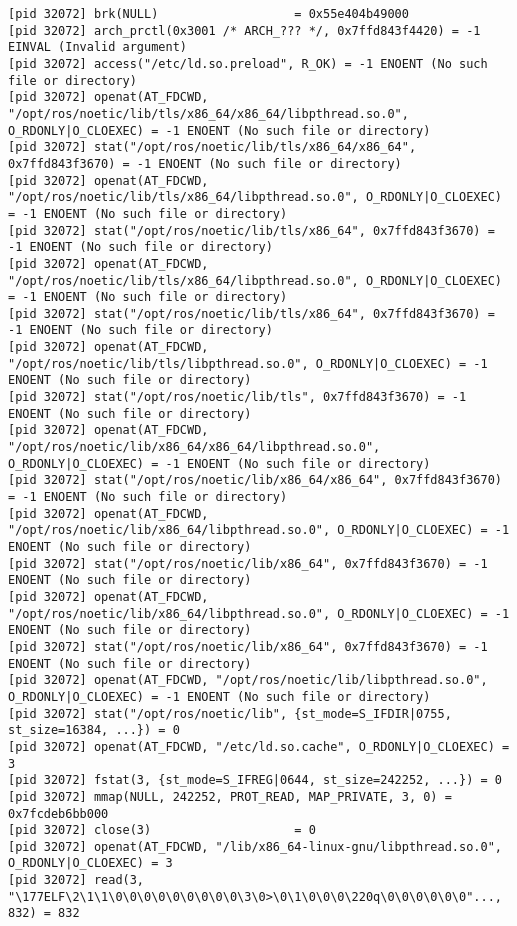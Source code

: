 \documentclass[a4paper, 14pt]{article}
\begin{document}
\begin{lstlisting}
[pid 32072] brk(NULL)                   = 0x55e404b49000
[pid 32072] arch_prctl(0x3001 /* ARCH_??? */, 0x7ffd843f4420) = -1 EINVAL (Invalid argument)
[pid 32072] access("/etc/ld.so.preload", R_OK) = -1 ENOENT (No such file or directory)
[pid 32072] openat(AT_FDCWD, "/opt/ros/noetic/lib/tls/x86_64/x86_64/libpthread.so.0", O_RDONLY|O_CLOEXEC) = -1 ENOENT (No such file or directory)
[pid 32072] stat("/opt/ros/noetic/lib/tls/x86_64/x86_64", 0x7ffd843f3670) = -1 ENOENT (No such file or directory)
[pid 32072] openat(AT_FDCWD, "/opt/ros/noetic/lib/tls/x86_64/libpthread.so.0", O_RDONLY|O_CLOEXEC) = -1 ENOENT (No such file or directory)
[pid 32072] stat("/opt/ros/noetic/lib/tls/x86_64", 0x7ffd843f3670) = -1 ENOENT (No such file or directory)
[pid 32072] openat(AT_FDCWD, "/opt/ros/noetic/lib/tls/x86_64/libpthread.so.0", O_RDONLY|O_CLOEXEC) = -1 ENOENT (No such file or directory)
[pid 32072] stat("/opt/ros/noetic/lib/tls/x86_64", 0x7ffd843f3670) = -1 ENOENT (No such file or directory)
[pid 32072] openat(AT_FDCWD, "/opt/ros/noetic/lib/tls/libpthread.so.0", O_RDONLY|O_CLOEXEC) = -1 ENOENT (No such file or directory)
[pid 32072] stat("/opt/ros/noetic/lib/tls", 0x7ffd843f3670) = -1 ENOENT (No such file or directory)
[pid 32072] openat(AT_FDCWD, "/opt/ros/noetic/lib/x86_64/x86_64/libpthread.so.0", O_RDONLY|O_CLOEXEC) = -1 ENOENT (No such file or directory)
[pid 32072] stat("/opt/ros/noetic/lib/x86_64/x86_64", 0x7ffd843f3670) = -1 ENOENT (No such file or directory)
[pid 32072] openat(AT_FDCWD, "/opt/ros/noetic/lib/x86_64/libpthread.so.0", O_RDONLY|O_CLOEXEC) = -1 ENOENT (No such file or directory)
[pid 32072] stat("/opt/ros/noetic/lib/x86_64", 0x7ffd843f3670) = -1 ENOENT (No such file or directory)
[pid 32072] openat(AT_FDCWD, "/opt/ros/noetic/lib/x86_64/libpthread.so.0", O_RDONLY|O_CLOEXEC) = -1 ENOENT (No such file or directory)
[pid 32072] stat("/opt/ros/noetic/lib/x86_64", 0x7ffd843f3670) = -1 ENOENT (No such file or directory)
[pid 32072] openat(AT_FDCWD, "/opt/ros/noetic/lib/libpthread.so.0", O_RDONLY|O_CLOEXEC) = -1 ENOENT (No such file or directory)
[pid 32072] stat("/opt/ros/noetic/lib", {st_mode=S_IFDIR|0755, st_size=16384, ...}) = 0
[pid 32072] openat(AT_FDCWD, "/etc/ld.so.cache", O_RDONLY|O_CLOEXEC) = 3
[pid 32072] fstat(3, {st_mode=S_IFREG|0644, st_size=242252, ...}) = 0
[pid 32072] mmap(NULL, 242252, PROT_READ, MAP_PRIVATE, 3, 0) = 0x7fcdeb6bb000
[pid 32072] close(3)                    = 0
[pid 32072] openat(AT_FDCWD, "/lib/x86_64-linux-gnu/libpthread.so.0", O_RDONLY|O_CLOEXEC) = 3
[pid 32072] read(3, "\177ELF\2\1\1\0\0\0\0\0\0\0\0\0\3\0>\0\1\0\0\0\220q\0\0\0\0\0\0"..., 832) = 832

\end{lstlisting}
\end{document}
